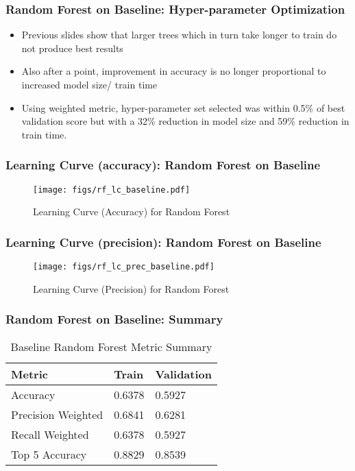 \documentclass{beamer}
\begin{document}
\begin{frame}
\frametitle{Random Forest on Baseline: Hyper-parameter Optimization}
\begin{itemize}
	\item Previous slides show that larger trees which in turn take longer to train do not produce best results
	\item Also after a point, improvement in accuracy is no longer proportional to increased model size/ train time
	\item Using weighted metric, hyper-parameter set selected was within 0.5\% of best validation score but with a 32\% reduction in model size and 59\% reduction in train time.
\end{itemize}
\end{frame}

\begin{frame}
\frametitle{Learning Curve (accuracy): Random Forest on Baseline}
\begin{figure}
	\texttt{[image: figs/rf\_lc\_baseline.pdf]}
	\caption{Learning Curve (Accuracy) for Random Forest}
\end{figure}
\end{frame}

\begin{frame}
\frametitle{Learning Curve (precision): Random Forest on Baseline}
\begin{figure}
\texttt{[image: figs/rf\_lc\_prec\_baseline.pdf]}
\caption{Learning Curve (Precision) for Random Forest}
\end{figure}
\end{frame}

\begin{frame}
\frametitle{Random Forest on Baseline: Summary }
\begin{table}[]
	\begin{tabular}{|l|l|l|}
		\hline
		Metric             & Train  & Validation \\ \hline
		Accuracy           & 0.6378 & 0.5927     \\ \hline
		Precision Weighted & 0.6841 & 0.6281     \\ \hline
		Recall Weighted    & 0.6378 & 0.5927     \\ \hline
		Top 5 Accuracy     & 0.8829 & 0.8539     \\ \hline
	\end{tabular}
	\caption{Baseline Random Forest Metric Summary}
	\label{table:tab_2}
\end{table}
\end{frame}
\end{document}
